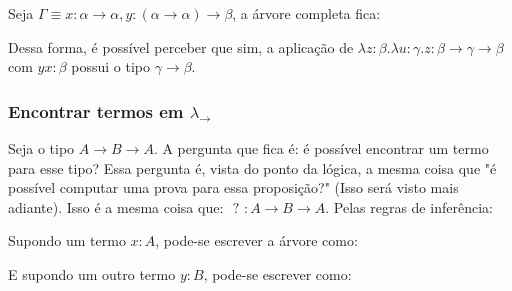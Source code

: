 \documentclass[../main.tex]{subfiles}
\begin{document}
Seja $\Gamma \equiv x : \alpha \to \alpha, y : (\alpha \to \alpha) \to \beta$, a árvore completa fica:


\begin{prooftree}
    

\end{prooftree}

Dessa forma, é possível perceber que sim, a aplicação de $\lambda z : \beta . \lambda u : \gamma . z : \beta \to \gamma \to \beta$ com $yx : \beta$ possui o tipo $\gamma \to \beta$. 


\subsubsection{Encontrar termos em $\lambda_\to$}

Seja o tipo $A \to B \to A$. A pergunta que fica é: é possível encontrar um termo para esse tipo? Essa pergunta é, vista do ponto da lógica, a mesma coisa que "é possível computar uma prova para essa proposição?" (Isso será visto mais adiante). Isso é a mesma coisa que: $\text{ ? } : A \to B \to A$. Pelas regras de inferência:

\begin{prooftree}
\end{prooftree}

Supondo um termo $x : A$, pode-se escrever a árvore como:

\begin{prooftree}
\end{prooftree}

E supondo um outro termo $y : B$, pode-se escrever como:
\end{document}
